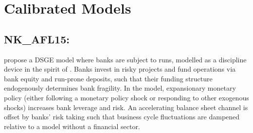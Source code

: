 \documentclass[11pt,a4paper]{article}
\begin{document}
	
	
	
	
	\newpage
	
	\section{Calibrated Models}
	
	
	\subsection{NK\_AFL15:\texorpdfstring{\cite{Angelonietal2015}}{Angeloni et al. (2015)}}
	\label{NKAFL15}
	\cite{Angelonietal2015} propose a DSGE model where banks are subject to runs, modelled as a discipline device in the spirit of \cite{diamond2000theory,diamond2001liquidity}. Banks invest in risky projects and fund operations via bank equity and run-prone deposits, such that their funding structure endogenously determines bank fragility. In the model, expansionary monetary policy (either following a monetary policy shock or responding to other exogenous shocks) increases bank leverage and risk. An accelerating balance sheet channel is offset by banks' risk taking such that business cycle fluctuations are dampened relative to a model without a financial sector.
\end{document}
